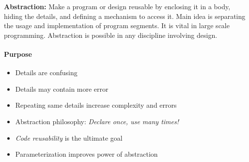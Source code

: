 \textbf{Abstraction:} Make a program or design reusable by enclosing it in a body, hiding the details, and defining a mechanism to access it. Main idea is separating the usage and implementation of program segments. It is vital in large scale programming. Abstraction is possible in any discipline involving design.

\paragraph*{Purpose}
\begin{itemize}
  \item Details are confusing
  \item Details may contain more error
  \item Repeating same details increase complexity and errors
  \item Abstraction philosophy: \textit{Declare once, use many times!}
  \item \textit{Code reusability} is the ultimate goal
  \item Parameterization improves power of abstraction
\end{itemize}
